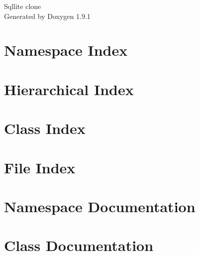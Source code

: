 \let\mypdfximage\pdfximage\def\pdfximage{\immediate\mypdfximage}\documentclass[twoside]{book}
\newcommand{\+}{\discretionary{\mbox{\scriptsize$\hookleftarrow$}}{}{}}
\newcommand{\clearemptydoublepage}{%
  \newpage{\pagestyle{empty}\cleardoublepage}%
}
\begin{document}
\raggedbottom

\hypersetup{pageanchor=false,
             bookmarksnumbered=true,
             pdfencoding=unicode
            }
\begin{titlepage}
\vspace*{7cm}
\begin{center}%
{\Large Sqllite clone }\\
\vspace*{1cm}
{\large Generated by Doxygen 1.9.1}\\
\end{center}
\end{titlepage}
\clearemptydoublepage
{}
\tableofcontents
\clearemptydoublepage
{}
\hypersetup{pageanchor=true}

\chapter{Namespace Index}

\chapter{Hierarchical Index}

\chapter{Class Index}

\chapter{File Index}

\chapter{Namespace Documentation}





\chapter{Class Documentation}















\end{document}
